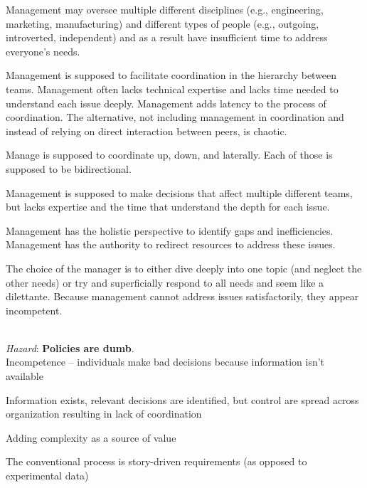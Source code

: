 Management may oversee multiple different disciplines (e.g., engineering, marketing, manufacturing) and different types of people (e.g., outgoing, introverted, independent) and as a result have insufficient time to address everyone's needs.

Management is supposed to facilitate coordination in the hierarchy between teams. Management often lacks technical expertise and lacks time needed to understand each issue deeply. Management adds latency to the process of coordination. The alternative, not including management in coordination and instead of relying on direct interaction between peers, is chaotic.

Manage is supposed to coordinate up, down, and laterally. Each of those is supposed to be bidirectional.

Management is supposed to make decisions that affect multiple different teams, but lacks expertise and the time that understand the depth for each issue.

Management has the holistic perspective to identify gaps and inefficiencies. Management has the authority to redirect resources to address these issues.

The choice of the manager is to either dive deeply into one topic (and neglect the other needs) or try and superficially respond to all needs and seem like a dilettante. Because management cannot address issues satisfactorily, they appear incompetent.





\ \\
\textit{Hazard}: \textbf{Policies are dumb}.\\
Incompetence -- individuals make bad decisions because information isn't available

Information exists, relevant decisions are identified, but control are spread across organization resulting in lack of coordination

Adding complexity as a source of value

The conventional process is story-driven requirements (as opposed to experimental data)


